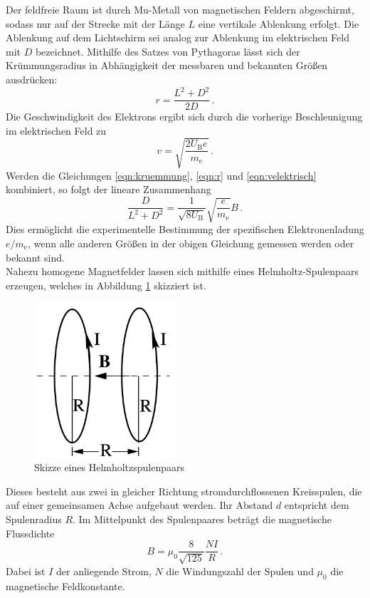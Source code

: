 Der feldfreie Raum ist durch Mu-Metall von magnetischen Feldern abgeschirmt, sodass
nur auf der Strecke mit der Länge $L$ eine vertikale Ablenkung erfolgt. Die Ablenkung
auf dem Lichtschirm sei analog zur Ablenkung im elektrischen Feld mit $D$ bezeichnet.
Mithilfe des Satzes von Pythagoras lässt sich der Krümmungsradius in Abhängigkeit
der messbaren und bekannten Größen ausdrücken:
\begin{equation}
  r = \frac{L^2 + D^2}{2 D}\,.
  \label{eqn:r}
\end{equation}
Die Geschwindigkeit des Elektrons ergibt sich durch die vorherige Beschleunigung
im elektrischen Feld zu
\begin{equation}
  v = \sqrt{\frac{2 U_\text{B} e}{m_\text{e}}}\,.
  \label{eqn:velektrisch}
\end{equation}
Werden die Gleichungen \eqref{eqn:kruemmung}, \eqref{eqn:r} und \eqref{eqn:velektrisch}
kombiniert, so folgt der lineare Zusammenhang
\begin{equation}
  \frac{D}{L^2 + D^2} = \frac{1}{\sqrt{8 U_\text{B}}} \sqrt{\frac{e}{m_\text{e}}} B\,.
\end{equation}
Dies ermöglicht die experimentelle Bestimmung der spezifischen Elektronenladung
$e/m_\text{e}$, wenn alle anderen Größen in der obigen Gleichung gemessen werden
oder bekannt sind. \\

Nahezu homogene Magnetfelder lassen sich mithilfe eines Helmholtz-Spulenpaars erzeugen, welches
in Abbildung \ref{fig:helmholtz} skizziert ist.

\begin{figure}
  \centering
  \includegraphics[width=150pt]{data/helmholtz.png}
  \caption{Skizze eines Helmholtzspulenpaars \cite{Versuchsanleitung308}}
  \label{fig:helmholtz}
\end{figure}

Dieses besteht aus zwei in gleicher Richtung stromdurchflossenen Kreisspulen, die
auf einer gemeinsamen Achse aufgebaut werden. Ihr Abstand $d$ entspricht dem Spulenradius $R$.
Im Mittelpunkt des Spulenpaares beträgt die magnetische Flussdichte
\begin{equation}
  B = \mu_0 \frac{8}{\sqrt{125}} \frac{N I}{R}\,.
  \label{eqn:helmholtz}
\end{equation}
Dabei ist $I$ der anliegende Strom, $N$ die Windungszahl der Spulen und $\mu_0$
die magnetische Feldkonstante.
